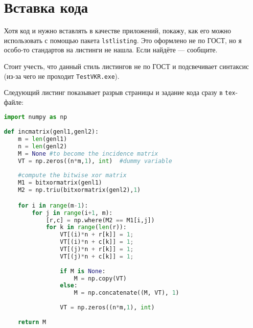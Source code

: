 \section{Вставка кода}

Хотя код и нужно вставлять в качестве приложений, покажу, как его можно использовать с помощью пакета \texttt{lstlisting}. Это оформлено не по ГОСТ, но я особо-то стандартов на листинги не нашла. Если найдёте --- сообщите.


Стоит учесть, что данный стиль листингов не по ГОСТ и подсвечивает синтаксис (из-за чего не проходит \texttt{TestVKR.exe}).

Следующий листинг показывает разрыв страницы и задание кода сразу в \texttt{tex}-файле:

\begin{lstlisting}[frame=rlbt,language=Python,caption={Длинный листинг}]
import numpy as np
    
def incmatrix(genl1,genl2):
    m = len(genl1)
    n = len(genl2)
    M = None #to become the incidence matrix
    VT = np.zeros((n*m,1), int)  #dummy variable
    
    #compute the bitwise xor matrix
    M1 = bitxormatrix(genl1)
    M2 = np.triu(bitxormatrix(genl2),1) 

    for i in range(m-1):
        for j in range(i+1, m):
            [r,c] = np.where(M2 == M1[i,j])
            for k in range(len(r)):
                VT[(i)*n + r[k]] = 1;
                VT[(i)*n + c[k]] = 1;
                VT[(j)*n + r[k]] = 1;
                VT[(j)*n + c[k]] = 1;
                
                if M is None:
                    M = np.copy(VT)
                else:
                    M = np.concatenate((M, VT), 1)
                
                VT = np.zeros((n*m,1), int)
    
    return M
\end{lstlisting}